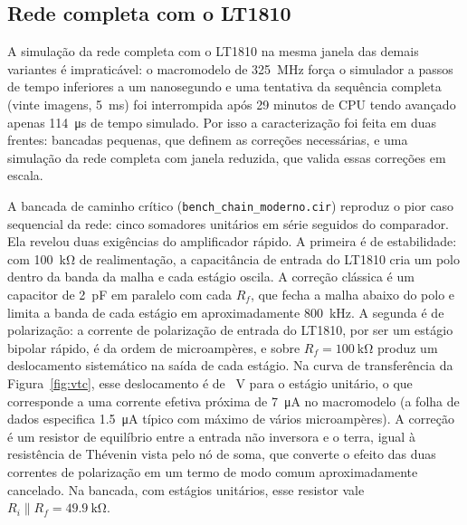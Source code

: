 \subsection{Rede completa com o LT1810}
\label{sec:moderno-rede}

A simulação da rede completa com o LT1810 na mesma janela das demais
variantes é impraticável: o macromodelo de \SI{325}{\mega\hertz} força
o simulador a passos de tempo inferiores a um nanosegundo e uma
tentativa da sequência completa (vinte imagens,
\SI{5}{\milli\second}) foi interrompida após 29 minutos de CPU tendo
avançado apenas \SI{114}{\micro\second} de tempo simulado. Por isso a
caracterização foi feita em duas frentes: bancadas pequenas, que
definem as correções necessárias, e uma simulação da rede completa com
janela reduzida, que valida essas correções em escala.

A bancada de caminho crítico (\texttt{bench\_chain\_moderno.cir})
reproduz o pior caso sequencial da rede: cinco somadores unitários em
série seguidos do comparador. Ela revelou duas exigências do
amplificador rápido. A primeira é de estabilidade: com
\SI{100}{\kilo\ohm} de realimentação, a capacitância de entrada do
LT1810 cria um polo dentro da banda da malha e cada estágio oscila. A
correção clássica é um capacitor de \SI{2}{\pico\farad} em paralelo
com cada $R_f$, que fecha a malha abaixo do polo e limita a banda de
cada estágio em aproximadamente \SI{800}{\kilo\hertz}. A segunda é de
polarização: a corrente de polarização de entrada do LT1810, por ser
um estágio bipolar rápido, é da ordem de microampères, e sobre
$R_f = \SI{100}{\kilo\ohm}$ produz um deslocamento sistemático na
saída de cada estágio. Na curva de transferência da
Figura~\ref{fig:vtc}, esse deslocamento é de \vVtcOffsetMod~\si{\volt}
para o estágio unitário, o que corresponde a uma corrente efetiva
próxima de \SI{7}{\micro\ampere} no macromodelo (a folha de dados
especifica \SI{1,5}{\micro\ampere} típico com máximo de vários
microampères). A correção é um resistor de equilíbrio entre a entrada
não inversora e o terra, igual à resistência de Thévenin vista pelo nó
de soma, que converte o efeito das duas correntes de polarização em um
termo de modo comum aproximadamente cancelado. Na bancada, com
estágios unitários, esse resistor vale
$R_i \parallel R_f = \SI{49,9}{\kilo\ohm}$.

